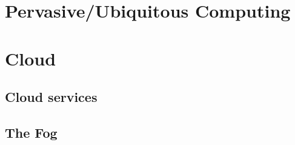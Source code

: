\section{Pervasive/Ubiquitous Computing}
\section{Cloud}


\subsection{Cloud services}


\subsection{The Fog}

\cite{cisco:fog}
